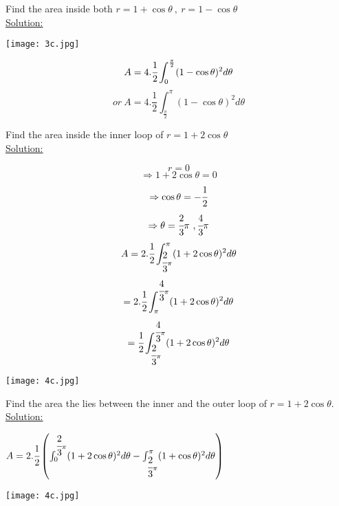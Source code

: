 \noindent{\color{smalt(darkpowderblue)}\rule{\linewidth}{.2mm}}
\begin{example}
Find the area inside both $r=1+\cos\theta~,~r=1-\cos\theta$\\
{\color{smalt(darkpowderblue)} \underline{Solution:}}
\begin{minipage}{0.4\textwidth}
\texttt{[image: 3c.jpg]}
\end{minipage}
\begin{minipage}{0.4\textwidth}
$$A=4.\cfrac{1}{2}\int_0^\frac{\pi}{2}(1-\cos\theta)^2 d\theta$$
$$or~A=4.\frac{1}{2}\int_\frac{\pi}{2}^\pi(1-\cos\theta)^2 d\theta$$
\end{minipage}
\end{example}
\noindent{\color{smalt(darkpowderblue)}\rule{\linewidth}{.2mm}}
\begin{example}
Find the area inside the inner loop of $r=1+2\cos\theta$\\
{\color{smalt(darkpowderblue)} \underline{Solution:}} \\ 
\begin{minipage}{0.5\textwidth}
$$r=0$$
$$\Rightarrow 1+2\cos\theta=0$$
$$\Rightarrow\cos\theta=-\cfrac{1}{2}$$
$$\Rightarrow\theta=\cfrac{2}{3}\pi~,\cfrac{4}{3}\pi$$
$$A=2.\cfrac{1}{2}\int_{\cfrac{2}{3}\pi}^\pi(1+2\cos\theta)^2 d\theta$$
$$=2.\cfrac{1}{2}\int_{\pi}^{\cfrac{4}{3}\pi}(1+2\cos\theta)^2 d\theta$$
$$=\cfrac{1}{2}\int_{\cfrac{2}{3}\pi}^{\cfrac{4}{3}\pi}(1+2\cos\theta)^2 d\theta$$
\end{minipage}
\begin{minipage}{0.5\textwidth}
\texttt{[image: 4c.jpg]}
\end{minipage}
\end{example}
\noindent{\color{smalt(darkpowderblue)}\rule{\linewidth}{.2mm}}
\begin{example}
Find the area the lies between the inner and the outer loop of $r=1+2\cos\theta$. \\
{\color{smalt(darkpowderblue)} \underline{Solution:}}\\ 
\begin{minipage}{0.75\textwidth}
$A=2.\cfrac{1}{2}\left(\int_0^{\cfrac{2}{3}\pi}(1+2\cos\theta)^2 d\theta-\int_{\cfrac{2}{3}\pi}^\pi(1+\cos\theta)^2d \theta\right)$
\end{minipage}
\begin{minipage}{0.5\textwidth}
\texttt{[image: 4c.jpg]}
\end{minipage}
\end{example}
